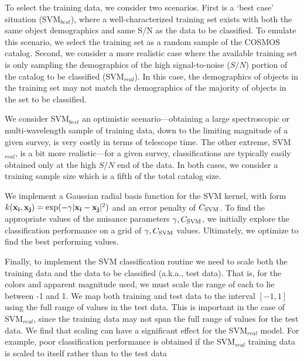 \documentclass[12pt,preprint]{aastex}
\begin{document}
To select the training data, we consider two scenarios.  First is a
`best case' situation (SVM$_{best}$), where a well-characterized
training set exists with both the same object demographics and same
S/N as the data to be classified.  To emulate this scenario, we select
the training set as a random sample of the COSMOS catalog.  Second, we
consider a more realistic case where the available training set is
only sampling the demographics of the high signal-to-noise ($S/N$)
portion of the catalog to be classified (SVM$_{real}$).  In this
case, the demographics of objects in the training set may not match
the demographics of the majority of objects in the set to be
classified.

We consider SVM$_{best}$ an optimistic scenario---obtaining a large
spectroscopic or multi-wavelength sample of training data, down to the
limiting magnitude of a given survey, is very costly in terms of
telescope time.  The other extreme, SVM$_{real}$, is a bit more
realistic---for a given survey, classifications are typically easily
obtained only at the high $S/N$ end of the data.  In both cases, we
consider a training sample size which is a fifth of the total catalog
size.

We implement a Gaussian radial basis function for the SVM kernel, with
form $k(\mathbf{x_i},\mathbf{x_j}) = {\rm
  exp}(-\gamma|\mathbf{x_i}-\mathbf{x_j}|^2)$ and an error penalty of
$C_{\rm SVM}$.  To find the appropriate values of the nuisance
parameters $\gamma,C_{\rm SVM}$, we initially explore the
classification performance on a grid of $\gamma,C_{\rm SVM}$ values.
Ultimately, we optimize to find the best performing values.

Finally, to implement the SVM classification routine we need to scale both 
the training data and the data to be classified (a.k.a., test data).  That is, for 
the colors and apparent magnitude used, we must scale the range of each to lie 
between -1 and 1.  We map both training and test data to the interval $[-1,1]$ 
using the full range of values in the test data.  This is important in the case 
of SVM$_{real}$, since the training data may not span the full range 
of values for the test data.  We find that scaling can have a significant 
effect for the SVM$_{real}$ model.  For example, poor classification performance is 
obtained if the SVM$_{real}$ training data is scaled to itself rather than to the test data

\end{document}
